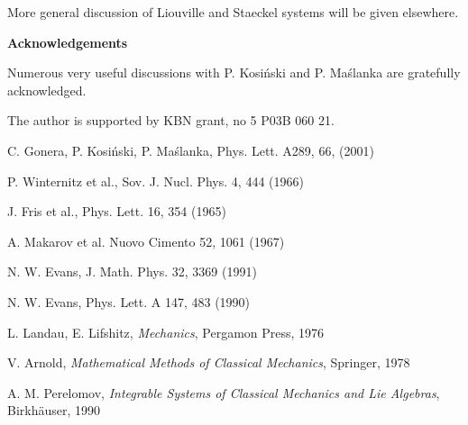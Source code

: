 \documentclass[a4paper,12pt]{article}
\begin{document}
More general discussion of Liouville and Staeckel systems will be given elsewhere.

\vspace{1cm}
{\noindent\bf\Large Acknowledgements}\linebreak

\noindent Numerous very useful discussions with P. Kosi\'nski and P. Ma\'slanka are
gratefully acknowledged.

\noindent The author is supported by KBN grant, no 5 P03B 060 21.

\begin{thebibliography}{9}

C. Gonera, P. Kosi\'nski, P. Ma\'slanka, Phys. Lett. A289, 66, (2001)

P. Winternitz et al., Sov. J. Nucl. Phys. 4, 444 (1966)

J. Fris et al., Phys. Lett. 16, 354 (1965)

A. Makarov et al. Nuovo Cimento 52, 1061 (1967)

N. W. Evans, J. Math. Phys. 32, 3369 (1991)

N. W. Evans, Phys. Lett. A 147, 483 (1990)

L. Landau, E. Lifshitz, {\em Mechanics}\/, Pergamon Press, 1976 

V. Arnold, {\em Mathematical Methods of Classical Mechanics}, Springer, 1978

A. M. Perelomov, {\em Integrable Systems of Classical Mechanics and Lie Algebras}\/, Birkh\"auser, 1990

\end{thebibliography}
\end{document}
